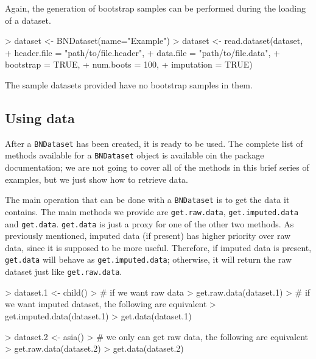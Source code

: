 \documentclass{article}
\newcommand{\Robject}[1]{{\texttt{#1}}}
\newcommand{\Rmethod}[1]{{\texttt{#1}}}
\begin{document}
Again, the generation of bootstrap samples can be performed during the loading of a dataset.
\begin{Schunk}
\begin{Sinput}
> dataset <- BNDataset(name="Example")
> dataset <- read.dataset(dataset,
+                         header.file = "path/to/file.header",
+                         data.file   = "path/to/file.data",
+                         bootstrap   = TRUE,
+                         num.boots   = 100,
+                         imputation  = TRUE)
\end{Sinput}
\end{Schunk}

The sample datasets provided have no bootstrap samples in them.

\subsection{Using data}
\label{sec:usingdata}
After a \Robject{BNDataset} has been created, it is ready to be used.
The complete list of methods available for a \Robject{BNDataset} object is available
oin the package documentation; we are not going to cover all of the methods in this brief series
of examples, but we just show how to retrieve data.

The main operation that can be done with a \Robject{BNDataset} is to get the data it contains.
The main methods we provide are \Rmethod{get.raw.data}, \Rmethod{get.imputed.data} and \Rmethod{get.data}. \Rmethod{get.data} is just a proxy
for one of the other two methods.
As previously mentioned, imputed data (if present) has higher priority over raw data, since it is supposed to be more useful.
Therefore, if imputed data is present, \Rmethod{get.data} will behave as \Rmethod{get.imputed.data}; otherwise,
it will return the raw dataset just like \Rmethod{get.raw.data}.

\begin{Schunk}
\begin{Sinput}
> dataset.1 <- child()
> # if we want raw data
> get.raw.data(dataset.1)
> # if we want imputed dataset, the following are equivalent
> get.imputed.data(dataset.1)
> get.data(dataset.1)
\end{Sinput}
\end{Schunk}

\begin{Schunk}
\begin{Sinput}
> dataset.2 <- asia()
> # we only can get raw data, the following are equivalent
> get.raw.data(dataset.2)
> get.data(dataset.2)
\end{Sinput}
\end{Schunk}
\end{document}
